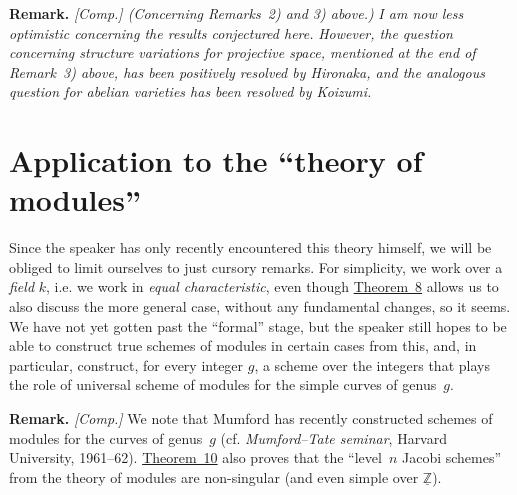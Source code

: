 \documentclass{article}
\newenvironment{rmenv}[1]
  {\phantomsection\par\medskip\noindent\textbf{#1.}\rmfamily}
  {\medskip}
\newcommand{\ZZ}{\mathbb{Z}}
\newcommand{\oldpage}[1]{\marginpar{\footnotesize$\Big\vert$ \textit{p.~#1}}}
\begin{document}
\begin{rmenv}{Remark}
  \emph{[Comp.] (Concerning Remarks~2) and 3) above.)}
  \emph{I am now less optimistic concerning the results conjectured here.}
  \emph{However, the question concerning structure variations for projective space, mentioned at the end of Remark~3) above, has been positively resolved by Hironaka, and the analogous question for abelian varieties has been resolved by Koizumi.}
\end{rmenv}


\section{Application to the ``theory of modules''}
\label{section7}

Since the speaker has only recently encountered this theory himself, we will be obliged to limit ourselves to just cursory remarks.
For simplicity, we work over a \emph{field} $k$, i.e. we work in \emph{equal characteristic}, even though \hyperref[theorem8]{Theorem~8} allows us to also discuss the more general case, without any fundamental changes, so it seems.
We have not yet gotten past the ``formal'' stage, but the speaker still hopes to be able to construct true schemes of modules
\oldpage{182-16}
in certain cases from this, and, in particular, construct, for every integer $g$, a scheme over the integers that plays the role of universal scheme of modules for the simple curves of genus~$g$.

\begin{rmenv}{Remark}
  \emph{[Comp.]}
  We note that Mumford has recently constructed schemes of modules for the curves of genus~$g$ (cf. \emph{Mumford--Tate seminar}, Harvard University, 1961--62).
  \hyperref[theorem10]{Theorem~10} also proves that the ``level~$n$ Jacobi schemes'' from the theory of modules are non-singular (and even simple over $\underline{\ZZ}$).
\end{rmenv}
\end{document}
